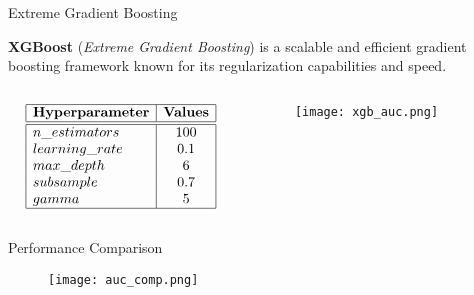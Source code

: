 \begin{frame}{Extreme Gradient Boosting}

    \textbf{XGBoost} (\textit{Extreme Gradient Boosting}) is a scalable and efficient gradient boosting framework known for its regularization capabilities and speed.

    \vspace{-1em}

    \begin{columns}
        \begin{column}{0.45\textwidth}
            {\small
            $$
            \begin{array}{|l|c|}
                \hline
                \textbf{Hyperparameter} & \textbf{Values} \\
                \hline
                \hline
                n\_estimators & 100 \\
                learning\_rate & 0.1 \\
                max\_depth & 6 \\
                subsample & 0.7 \\
                gamma & 5 \\
                \hline
            \end{array}
            $$
            }
        \end{column}
        \begin{column}{0.55\textwidth}
            \begin{figure}
                \centering
                \vfill
                \texttt{[image: xgb\_auc.png]}
            \end{figure}
        \end{column}
    \end{columns}
\end{frame}

\begin{frame}{Performance Comparison}

    \begin{figure}
        \centering
        \vfill
        \texttt{[image: auc\_comp.png]}
    \end{figure}

\end{frame}

